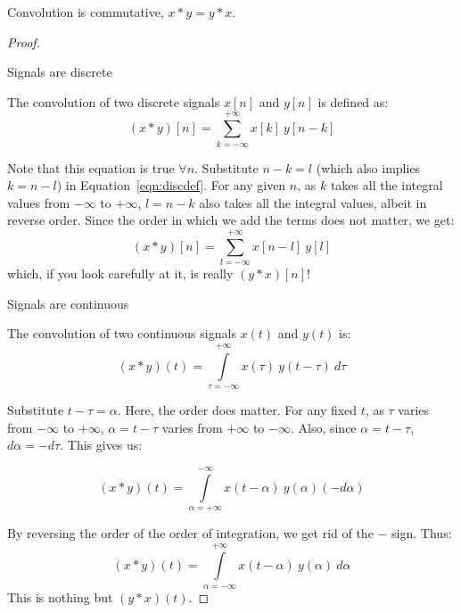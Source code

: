 \begin{theorem}
Convolution is commutative, $x\ast y=y\ast x$.
\end{theorem}
\begin{proof}
\begin{case}
Signals are discrete
\end{case}
The convolution of two discrete signals $x[n]$ and $y[n]$ is defined as:
\begin{equation}
\label{eqn:discdef}
\left(x \ast y\right)[n] = \sum_{k=-\infty}^{+\infty} x[k]\ y[n-k]
\end{equation}

Note that this equation is true $\forall n$. Substitute $n-k=l$ (which also implies $k=n-l$) in Equation~\ref{eqn:discdef}. For any given $n$, as $k$ takes all the integral values from $-\infty$ to $+\infty$, $l=n-k$ also takes all the integral values, albeit in reverse order. Since the order in which we add the terms does not matter, we get:
\begin{equation}
\left(x \ast y\right)[n] = \sum_{l=-\infty}^{+\infty} x[n-l]\ y[l]
\end{equation}
which, if you look carefully at it, is really $(y \ast x)[n]$!
\begin{case}
Signals are continuous
\end{case}
The convolution of two continuous signals $x(t)$ and $y(t)$ is:
\begin{equation}
\label{eqn:contdef}
(x\ast y)(t) =\int\limits_{\tau=-\infty}^{+\infty} x(\tau)\ y(t-\tau)\ d\tau
\end{equation}

Substitute $t-\tau =\alpha$. Here, the order does matter. For any fixed $t$, as $\tau$ varies from $-\infty$ to $+\infty$, $\alpha=t-\tau$ varies from $+\infty$ to $-\infty$. Also, since $\alpha=t-\tau$, $d\alpha=-d\tau$. This gives us:

\begin{equation}
(x\ast y)(t) =\int\limits_{\alpha=+\infty}^{-\infty} x(t-\alpha)\ y(\alpha)(-d\alpha)
\end{equation}

By reversing the order of the order of integration, we get rid of the $-$ sign. Thus:
\begin{equation}
(x\ast y)(t) =\int\limits_{\alpha=-\infty}^{+\infty} x(t-\alpha)\ y(\alpha)\ d\alpha
\end{equation}
This is nothing but $(y\ast x)(t)$.
\end{proof}

